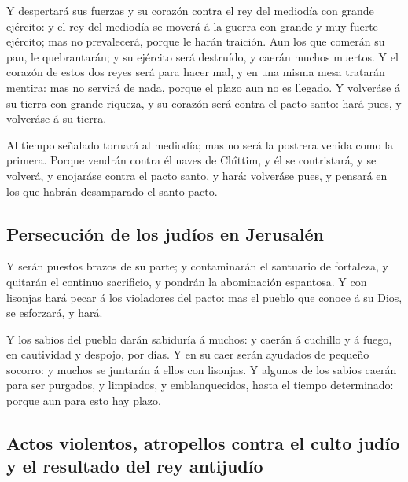  Y despertará sus fuerzas y su corazón contra el rey del
mediodía con grande ejército: y el rey del mediodía se moverá á la
guerra con grande y muy fuerte ejército; mas no prevalecerá, porque le
harán traición.  Aun los que comerán su pan, le
quebrantarán; y su ejército será destruído, y caerán muchos muertos.
 Y el corazón de estos dos reyes será para hacer mal, y en
una misma mesa tratarán mentira: mas no servirá de nada, porque el plazo
aun no es llegado.  Y volveráse á su tierra con grande
riqueza, y su corazón será contra el pacto santo: hará pues, y volveráse
á su tierra.

 Al tiempo señalado tornará al mediodía; mas no será la
postrera venida como la primera.  Porque vendrán contra él
naves de Chîttim, y él se contristará, y se volverá, y enojaráse contra
el pacto santo, y hará: volveráse pues, y pensará en los que habrán
desamparado el santo pacto.

\hypertarget{persecuciuxf3n-de-los-juduxedos-en-jerusaluxe9n}{%
\subsection{Persecución de los judíos en
Jerusalén}\label{persecuciuxf3n-de-los-juduxedos-en-jerusaluxe9n}}

 Y serán puestos brazos de su parte; y contaminarán el
santuario de fortaleza, y quitarán el continuo sacrificio, y pondrán la
abominación espantosa.  Y con lisonjas hará pecar á los
violadores del pacto: mas el pueblo que conoce á su Dios, se esforzará,
y hará.

 Y los sabios del pueblo darán sabiduría á muchos: y caerán
á cuchillo y á fuego, en cautividad y despojo, por días.  Y
en su caer serán ayudados de pequeño socorro: y muchos se juntarán á
ellos con lisonjas.  Y algunos de los sabios caerán para
ser purgados, y limpiados, y emblanquecidos, hasta el tiempo
determinado: porque aun para esto hay plazo.

\hypertarget{actos-violentos-atropellos-contra-el-culto-juduxedo-y-el-resultado-del-rey-antijuduxedo}{%
\subsection{Actos violentos, atropellos contra el culto judío y el
resultado del rey
antijudío}\label{actos-violentos-atropellos-contra-el-culto-juduxedo-y-el-resultado-del-rey-antijuduxedo}}

